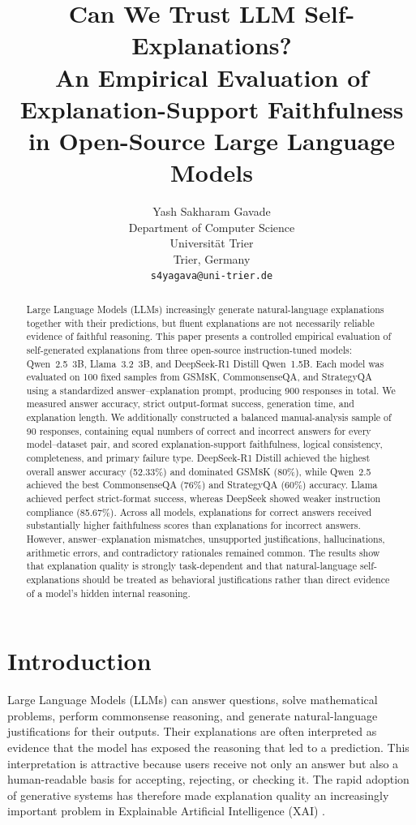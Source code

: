 \documentclass{article}
\title{Can We Trust LLM Self-Explanations?\\
An Empirical Evaluation of Explanation-Support Faithfulness in Open-Source Large Language Models}
\author{
Yash Sakharam Gavade\\
Department of Computer Science\\
Universit\"at Trier\\
Trier, Germany\\
\texttt{s4yagava@uni-trier.de}
}
\begin{document}
\maketitle

\begin{abstract}
Large Language Models (LLMs) increasingly generate natural-language explanations together with their predictions, but fluent explanations are not necessarily reliable evidence of faithful reasoning. This paper presents a controlled empirical evaluation of self-generated explanations from three open-source instruction-tuned models: Qwen~2.5~3B, Llama~3.2~3B, and DeepSeek-R1 Distill Qwen~1.5B. Each model was evaluated on 100 fixed samples from GSM8K, CommonsenseQA, and StrategyQA using a standardized answer--explanation prompt, producing 900 responses in total. We measured answer accuracy, strict output-format success, generation time, and explanation length. We additionally constructed a balanced manual-analysis sample of 90 responses, containing equal numbers of correct and incorrect answers for every model--dataset pair, and scored explanation-support faithfulness, logical consistency, completeness, and primary failure type. DeepSeek-R1 Distill achieved the highest overall answer accuracy (52.33\%) and dominated GSM8K (80\%), while Qwen~2.5 achieved the best CommonsenseQA (76\%) and StrategyQA (60\%) accuracy. Llama achieved perfect strict-format success, whereas DeepSeek showed weaker instruction compliance (85.67\%). Across all models, explanations for correct answers received substantially higher faithfulness scores than explanations for incorrect answers. However, answer--explanation mismatches, unsupported justifications, hallucinations, arithmetic errors, and contradictory rationales remained common. The results show that explanation quality is strongly task-dependent and that natural-language self-explanations should be treated as behavioral justifications rather than direct evidence of a model's hidden internal reasoning.
\end{abstract}



\section{Introduction}

Large Language Models (LLMs) can answer questions, solve mathematical problems, perform commonsense reasoning, and generate natural-language justifications for their outputs. Their explanations are often interpreted as evidence that the model has exposed the reasoning that led to a prediction. This interpretation is attractive because users receive not only an answer but also a human-readable basis for accepting, rejecting, or checking it. The rapid adoption of generative systems has therefore made explanation quality an increasingly important problem in Explainable Artificial Intelligence (XAI) \cite{gunning2019darpa,chang2024survey,schneider2024genxai}.
\end{document}
